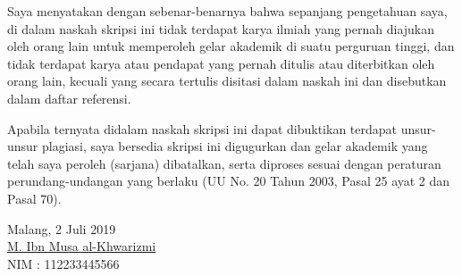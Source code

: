 \documentclass{skripsi}
\begin{document}
\cover

\approvalpage

{\orisinalitas

  Saya menyatakan dengan sebenar-benarnya bahwa sepanjang pengetahuan
  saya, di dalam naskah skripsi ini tidak terdapat karya ilmiah yang
  pernah diajukan oleh orang lain untuk memperoleh gelar akademik di
  suatu perguruan tinggi, dan tidak terdapat karya atau pendapat yang
  pernah ditulis atau diterbitkan oleh orang lain, kecuali yang secara
  tertulis disitasi dalam naskah ini dan disebutkan dalam daftar
  referensi.

  Apabila ternyata didalam naskah skripsi ini dapat dibuktikan
  terdapat unsur-unsur plagiasi, saya bersedia skripsi ini digugurkan
  dan gelar akademik yang telah saya peroleh (sarjana) dibatalkan,
  serta diproses sesuai dengan peraturan perundang-undangan yang
  berlaku (UU No. 20 Tahun 2003, Pasal 25 ayat 2 dan Pasal 70).
  \vspace{1.5cm}

  \noindent
  \hspace*{8cm}Malang, 2 Juli 2019   \vspace{2.5cm}   \\

  \hspace*{7cm}\underline{M. Ibn Musa al-Khwarizmi} \\
  \hspace*{8cm}NIM : 112233445566
}
\end{document}
